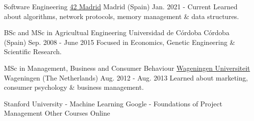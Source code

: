 
\begin{cventries}

  \cventry
    {Software Engineering} %
    {\href{https://42.fr/en/homepage/}{42 Madrid}} %
    {Madrid (Spain)} %
    {Jan. 2021 - Current} %
    {
      {Learned about algorithms, network protocols, memory management \& data structures.}
    }

  \cventry
    {BSc and MSc in Agricultual Engineering} %
    {Universidad de Córdoba} %
    {Córdoba (Spain)} %
    {Sep. 2008 - June 2015} %
    {
      {Focused in Economics, Genetic Engineering \& Scientific Research.}
    }

  \cventry
    {MSc in Management, Business and Consumer Behaviour} %
    {\href{https://www.wur.nl/en.htm}{Wageningen Universiteit}} %
    {Wageningen (The Netherlands)} %
    {Aug. 2012 - Aug. 2013} %
    {
      {Learned about marketing, consumer psychology \& business management.}
    }

  \cventry
    {Stanford University - Machine Learning \break Google - Foundations of Project Management} %
    {Other Courses} %
    {Online} %
    {} %
    {
    }



\end{cventries}
